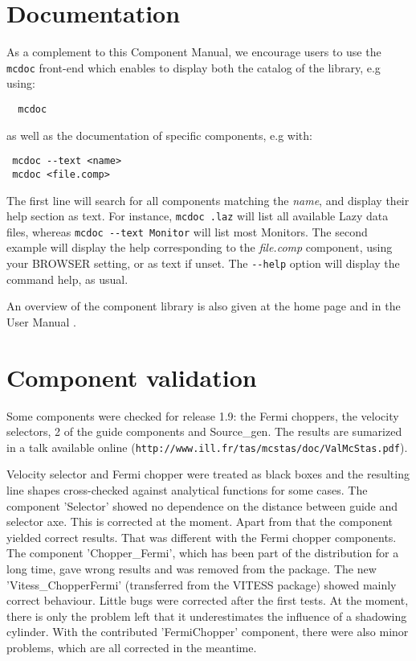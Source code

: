 \section{Documentation}
As a complement to this Component Manual, we encourage users to use
the \verb+mcdoc+ front-end which enables to display both the
catalog of the \MCS library, e.g using: 
\begin{lstlisting}
  mcdoc
\end{lstlisting}
as well as the documentation of specific components, e.g with:
\begin{lstlisting}
 mcdoc --text <name>
 mcdoc <file.comp>
\end{lstlisting}
The first line will search for all components matching the \textit{name},
and display their help section as text. For instance, \verb+mcdoc .laz+ will list all available Lazy data files, whereas \verb+mcdoc --text Monitor+ will list most Monitors.
The second example will display the help corresponding to
the \textit{file.comp} component, using your
BROWSER setting, or as text if unset.
The \verb+--help+ option will display the command help, as usual.

An overview of the component library is also given at the \MCS home page \cite{mcstas_webpage} and in the User Manual \cite{mcstasmanual}.

\section{Component validation}

Some components were checked for release 1.9: the Fermi choppers, the velocity selectors, 2 of the guide components and Source\_gen. The results are sumarized in a talk available online (\verb+http://www.ill.fr/tas/mcstas/doc/ValMcStas.pdf+).

Velocity selector and Fermi chopper were treated as black boxes and the resulting line shapes cross-checked against analytical functions for some cases.
The component 'Selector' showed no dependence on the distance between guide and selector axe. This is corrected at the moment. Apart from that the component yielded correct results.
That was different with the Fermi chopper components. The component 'Chopper\_Fermi', which has been part of the \MCS distribution for a long time, gave wrong results and was removed from the package. The new 'Vitess\_ChopperFermi' (transferred from the VITESS package) showed mainly correct behaviour. Little bugs were corrected after the first tests. At the moment, there is only the problem left that it underestimates the influence of a shadowing cylinder. With the contributed 'FermiChopper' component, there were also minor problems, which are all corrected in the meantime.

